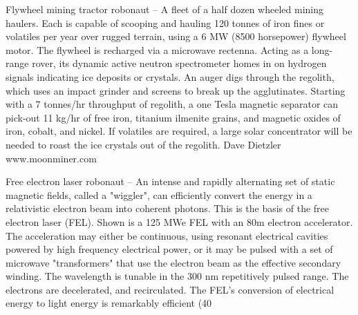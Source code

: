 \documentclass[a4paper]{book}
\begin{document}
Flywheel mining tractor robonaut – A fleet of a half dozen wheeled mining haulers.  Each is capable of scooping and hauling 120 tonnes of iron fines or volatiles per year over rugged terrain, using a 6 MW (8500 horsepower) flywheel motor.  The flywheel is recharged via a microwave rectenna. Acting as a long-range rover, its dynamic active neutron spectrometer homes in on hydrogen signals indicating ice deposits or crystals. An auger digs through the regolith, which uses an impact grinder and screens to break up the agglutinates.  Starting with a 7 tonnes/hr throughput of regolith, a one Tesla magnetic separator can pick-out 11 kg/hr of free iron, titanium ilmenite grains, and magnetic oxides of iron, cobalt, and nickel. If volatiles are required, a large solar concentrator will be needed to roast the ice crystals out of the regolith. Dave Dietzler  www.moonminer.com
 
Free electron laser robonaut – An intense and rapidly alternating set of static magnetic fields, called a "wiggler", can efficiently convert the energy in a relativistic electron beam into coherent photons. This is the basis of the free electron laser (FEL). Shown is a 125 MWe FEL with an 80m electron accelerator. The acceleration may either be continuous, using resonant electrical cavities powered by high frequency electrical power, or it may be pulsed with a set of microwave "transformers" that use the electron beam as the effective secondary winding. The wavelength is tunable in the 300 nm repetitively pulsed range. The electrons are decelerated, and recirculated.  The FEL's conversion of electrical energy to light energy is remarkably efficient (40%
 
\end{document}
